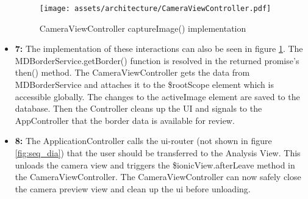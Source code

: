 \begin{itemize}[label={}]
        \begin{figure}[H]
            \centering
            \texttt{[image: assets/architecture/CameraViewController.pdf]}
            \caption{CameraViewController captureImage() implementation}
            \label{fig:CameraViewController}
        \end{figure}

    \item \textbf{7:} The implementation of these interactions can also be seen in figure \ref{fig:CameraViewController}. The MDBorderService.getBorder() function is resolved in the returned promise's then() method. The CameraViewController gets the data from MDBorderService and attaches it to the \$rootScope element which is accessible globally. The changes to the activeImage element are saved to the database. Then the Controller cleans up the UI and signals to the AppController that the border data is available for review.

    \item \textbf{8:} The ApplicationController calls the ui-router (not shown in figure \ref{fig:seq_dia}) that the user should be transferred to the Analysis View. This unloads the camera view and triggers the \$ionicView.afterLeave method in the CameraViewController. The CameraViewController can now safely close the camera preview view and clean up the ui before unloading.

\end{itemize}



